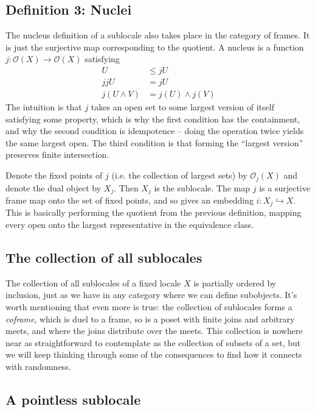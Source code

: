 \documentclass[14pt]{extarticle}
\renewcommand{\o}{\ensuremath{\mathcal{O}}}
\begin{document}
\subsection{Definition 3: Nuclei}
The nucleus definition of a sublocale also takes place in the category of frames. It is just the surjective map corresponding to the quotient. A nucleus is a function $j:\o(X)\to\o(X)$ satisfying
\begin{align*}
U&\leq jU \\
jjU &= jU \\
j(U\wedge V)&=j(U)\wedge j(V)
\end{align*}
The intuition is that $j$ takes an open set to some largest version of itself satisfying some property, which is why the first condition has the containment, and why the second condition is idempotence -- doing the operation twice yields the same largest open. The third condition is that forming the ``largest version'' preserves finite intersection.

Denote the fixed points of $j$ (i.e. the collection of largest sets) by $\o_j(X)$ and denote the dual object by $X_j$. Then $X_j$ is the sublocale. The map $j$ is a surjective frame map onto the set of fixed points, and so gives an embedding $i:X_j\hookrightarrow X$. This is basically performing the quotient from the previous definition, mapping every open onto the largest representative in the equivalence class.

\subsection{The collection of all sublocales}

The collection of all sublocales of a fixed locale $X$ is partially ordered by inclusion, just as we have in any category where we can define subobjects. It's worth mentioning that even more is true: the collection of sublocales forms a \emph{coframe}, which is duel to a frame, so is a poset with finite joins and arbitrary meets, and where the joins distribute over the meets. This collection is nowhere near as straightforward to contemplate as the collection of subsets of a set, but we will keep thinking through some of the consequences to find how it connects with randomness.

\subsection{A pointless sublocale}
\end{document}
